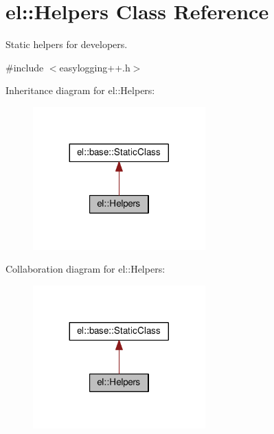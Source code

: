 \hypertarget{classel_1_1_helpers}{}\section{el\+:\+:Helpers Class Reference}
\label{classel_1_1_helpers}


Static helpers for developers.  




{\ttfamily \#include $<$easylogging++.\+h$>$}



Inheritance diagram for el\+:\+:Helpers\+:
\nopagebreak
\begin{figure}[H]
\begin{center}
\leavevmode
\includegraphics[width=188pt]{classel_1_1_helpers__inherit__graph}
\end{center}
\end{figure}


Collaboration diagram for el\+:\+:Helpers\+:
\nopagebreak
\begin{figure}[H]
\begin{center}
\leavevmode
\includegraphics[width=188pt]{classel_1_1_helpers__coll__graph}
\end{center}
\end{figure}
